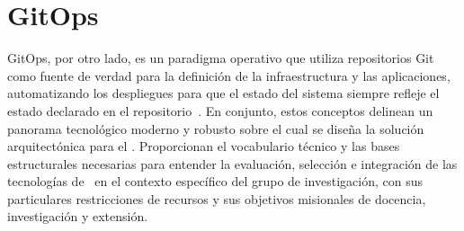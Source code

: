 \section{GitOps}
GitOps, por otro lado, es un paradigma operativo que utiliza repositorios Git como fuente de verdad para la definición de la infraestructura y las aplicaciones, automatizando los despliegues para que el estado del sistema siempre refleje el estado declarado en el repositorio~\citep{kormanik2023exploring}. En conjunto, estos conceptos delinean un panorama tecnológico moderno y robusto sobre el cual se diseña la solución arquitectónica para el \GRID. Proporcionan el vocabulario técnico y las bases estructurales necesarias para entender la evaluación, selección e integración de las tecnologías de \VBC\ en el contexto específico del grupo de investigación, con sus particulares restricciones de recursos y sus objetivos misionales de docencia, investigación y extensión.


